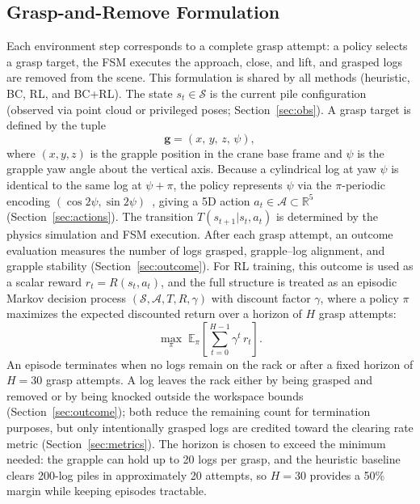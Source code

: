 \documentclass[conference]{IEEEtran}
\begin{document}
\subsection{Grasp-and-Remove Formulation}
\label{sec:formulation}
Each environment step corresponds to a complete grasp attempt: a policy selects a grasp target, the FSM executes the approach, close, and lift, and grasped logs are removed from the scene.
This formulation is shared by all methods (heuristic, BC, RL, and BC+RL).
The state $s_t \in \mathcal{S}$ is the current pile configuration (observed via point cloud or privileged poses; Section~\ref{sec:obs}).
A grasp target is defined by the tuple
\begin{equation}
    \mathbf{g} = (x,\, y,\, z,\, \psi),
\end{equation}
where $(x, y, z)$ is the grapple position in the crane base frame and $\psi$ is the grapple yaw angle about the vertical axis.
Because a cylindrical log at yaw $\psi$ is identical to the same log at $\psi + \pi$, the policy represents $\psi$ via the $\pi$-periodic encoding $(\cos 2\psi, \sin 2\psi)$~\cite{morrison2018closing}, giving a 5D action $a_t \in \mathcal{A} \subset \mathbb{R}^5$ (Section~\ref{sec:actions}).
The transition $T(s_{t+1}|s_t, a_t)$ is determined by the physics simulation and FSM execution.
After each grasp attempt, an outcome evaluation measures the number of logs grasped, grapple--log alignment, and grapple stability (Section~\ref{sec:outcome}).
For RL training, this outcome is used as a scalar reward $r_t = R(s_t, a_t)$, and the full structure is treated as an episodic Markov decision process $(\mathcal{S}, \mathcal{A}, T, R, \gamma)$ with discount factor $\gamma$, where a policy $\pi$ maximizes the expected discounted return over a horizon of $H$ grasp attempts:
\begin{equation}
    \max_\pi \; \mathbb{E}_\pi \!\left[\sum_{t=0}^{H-1} \gamma^t \, r_t \right].
\end{equation}
An episode terminates when no logs remain on the rack or after a fixed horizon of $H=30$ grasp attempts.
A log leaves the rack either by being grasped and removed or by being knocked outside the workspace bounds (Section~\ref{sec:outcome}); both reduce the remaining count for termination purposes, but only intentionally grasped logs are credited toward the clearing rate metric (Section~\ref{sec:metrics}).
The horizon is chosen to exceed the minimum needed: the grapple can hold up to 20 logs per grasp, and the heuristic baseline clears 200-log piles in approximately 20 attempts, so $H=30$ provides a 50\% margin while keeping episodes tractable.
\end{document}
